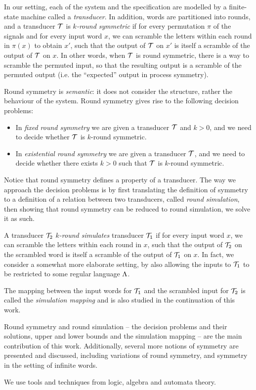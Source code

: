 {In our setting, each of the system and the specification are modelled by a finite-state machine called a \emph{transducer}. In addition, words are partitioned into rounds, and a transducer $\mathcal{T}$ is \emph{$k$-round symmetric} if for every permutation $\pi$ of the signals and for every input word $x$, we can scramble the letters within each round in $\pi(x)$ to obtain $x'$, such that the output of $\mathcal{T}$ on $x'$ is itself a scramble of the output of $\mathcal{T}$ on $x$. In other words, when $\mathcal{T}$ is round symmetric, there is a way to scramble the permuted input, so that the resulting output is a scramble of the permuted output (i.e. the ``expected'' output in process symmetry).

Round symmetry is \emph{semantic}: it does not consider the structure, rather the behaviour of the system. Round symmetry gives rise to the following decision problems:
\begin{itemize}
	\item In \emph{fixed round symmetry} we are given a transducer $\mathcal{T}$ and $k>0$, and we need to decide whether $\mathcal{T}$ is $k$-round symmetric.
	\item In \emph{existential round symmetry} we are given a transducer $\mathcal{T}$, and we need to decide whether there exists $k>0$ such that $\mathcal{T}$ is $k$-round symmetric.
\end{itemize}

Notice that round symmetry defines a property of a transducer. The way we approach the decision problems is by first translating the definition of symmetry to a definition of a relation between two transducers, called \emph{round simulation}, then showing that round symmetry can be reduced to round simulation, we solve it as such.

A transducer $\mathcal{T}_2$ \emph{$k$-round simulates} transducer $\mathcal{T}_1$ if for every input word $x$, we can scramble the letters within each round in $x$, such that the output of $\mathcal{T}_2$ on the scrambled word is itself a scramble of the output of $\mathcal{T}_1$ on $x$.
In fact, we consider a somewhat more elaborate setting, by also allowing the inputs to $\mathcal{T}_1$ to be restricted to some regular language $\Lambda$.

The mapping between the input words for $\mathcal{T}_1$ and the scrambled input for $\mathcal{T}_2$ is called the \emph{simulation mapping} and is also studied in the continuation of this work.

Round symmetry and round simulation -- the decision problems and their solutions, upper and lower bounds and the simulation mapping -- are the main contribution of this work.
Additionally, several more notions of symmetry are presented and discussed, including variations of round symmetry, and symmetry in the setting of infinite words.

We use tools and techniques from logic, algebra and automata theory.
} %

